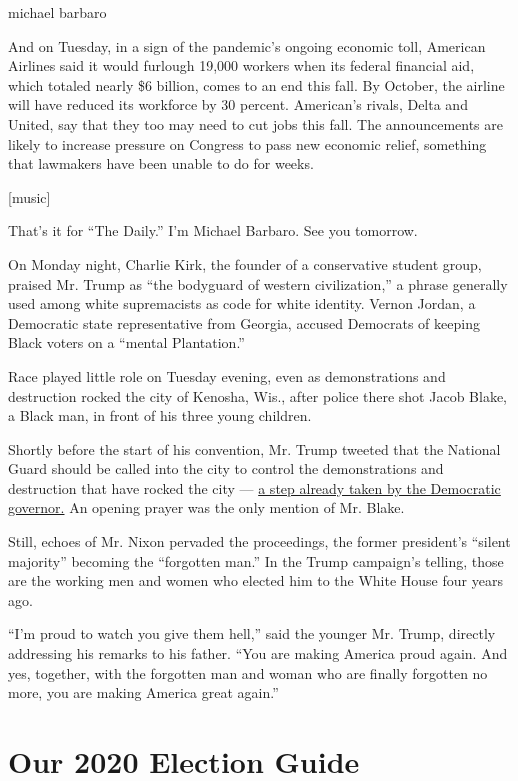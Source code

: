 michael barbaro

And on Tuesday, in a sign of the pandemic's ongoing economic toll,
American Airlines said it would furlough 19,000 workers when its federal
financial aid, which totaled nearly \$6 billion, comes to an end this
fall. By October, the airline will have reduced its workforce by 30
percent. American's rivals, Delta and United, say that they too may need
to cut jobs this fall. The announcements are likely to increase pressure
on Congress to pass new economic relief, something that lawmakers have
been unable to do for weeks.

{[}music{]}

That's it for ``The Daily.'' I'm Michael Barbaro. See you tomorrow.

On Monday night, Charlie Kirk, the founder of a conservative student
group, praised Mr. Trump as ``the bodyguard of western civilization,'' a
phrase generally used among white supremacists as code for white
identity. Vernon Jordan, a Democratic state representative from Georgia,
accused Democrats of keeping Black voters on a ``mental Plantation.''

Race played little role on Tuesday evening, even as demonstrations and
destruction rocked the city of Kenosha, Wis., after police there shot
Jacob Blake, a Black man, in front of his three young children.

Shortly before the start of his convention, Mr. Trump tweeted that the
National Guard should be called into the city to control the
demonstrations and destruction that have rocked the city ---
\href{https://www.nytimes3xbfgragh.onion/2020/08/25/us/jacob-blake-kenosha-fires.html}{a
step already taken by the Democratic governor.} An opening prayer was
the only mention of Mr. Blake.

Still, echoes of Mr. Nixon pervaded the proceedings, the former
president's ``silent majority'' becoming the ``forgotten man.'' In the
Trump campaign's telling, those are the working men and women who
elected him to the White House four years ago.

``I'm proud to watch you give them hell,'' said the younger Mr. Trump,
directly addressing his remarks to his father. ``You are making America
proud again. And yes, together, with the forgotten man and woman who are
finally forgotten no more, you are making America great again.''

\hypertarget{our-2020-election-guide}{%
\section{Our 2020 Election Guide}\label{our-2020-election-guide}}

